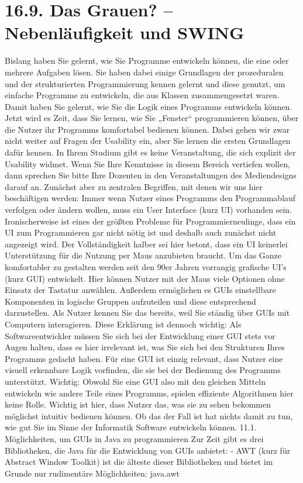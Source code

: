 \section{16.9.	Das Grauen? – Nebenläufigkeit und SWING}
Bislang haben Sie gelernt, wie Sie Programme entwickeln können, die eine oder mehrere Aufgaben lösen. Sie haben dabei einige Grundlagen der prozeduralen und der strukturierten Programmierung kennen gelernt und diese genutzt, um einfache Programme zu entwickeln, die aus Klassen zusammengesetzt waren.
Damit haben Sie gelernt, wie Sie die Logik eines Programms entwickeln können. Jetzt wird es Zeit, dass Sie lernen, wie Sie „Fenster“ programmieren können, über die Nutzer ihr Programms komfortabel bedienen können. Dabei gehen wir zwar nicht weiter auf Fragen der Usability  ein, aber Sie lernen die ersten Grundlagen dafür kennen. In Ihrem Studium gibt es keine Veranstaltung, die sich explizit der Usability widmet. Wenn Sie Ihre Kenntnisse in diesem Bereich vertiefen wollen, dann sprechen Sie bitte Ihre Dozenten in den Veranstaltungen des Mediendesigns darauf an.
Zunächst aber zu zentralen Begriffen, mit denen wir uns hier beschäftigen werden:
Immer wenn Nutzer eines Programms den Programmablauf verfolgen oder ändern wollen, muss ein User Interface (kurz UI) vorhanden sein. Ironischerweise ist eines der größten Probleme für Programmierneulinge, dass ein UI zum Programmieren gar nicht nötig ist und deshalb auch zunächst nicht angezeigt wird. Der Vollständigkeit halber sei hier betont, dass ein UI keinerlei Unterstützung für die Nutzung per Maus anzubieten braucht.
Um das Ganze komfortabler zu gestalten werden seit den 90er Jahren vorrangig grafische UI’s (kurz GUI) entwickelt. Hier können Nutzer mit der Maus viele Optionen ohne Einsatz der Tastatur anwählen. Außerdem ermöglichen es GUIs einstellbare Komponenten in logische Gruppen aufzuteilen und diese entsprechend darzustellen. Als Nutzer kennen Sie das bereits, weil Sie ständig über GUIs mit Computern interagieren. Diese Erklärung ist dennoch wichtig: Als Softwareentwickler müssen Sie sich bei der Entwicklung einer GUI  stets vor Augen halten, dass es hier irrelevant ist, was Sie sich bei den Strukturen Ihres Programms gedacht haben. Für eine GUI ist einzig relevant, dass Nutzer eine visuell erkennbare Logik vorfinden, die sie bei der Bedienung des Programms unterstützt.
Wichtig: Obwohl Sie eine GUI also mit den gleichen Mitteln entwickeln wie andere Teile eines Programms, spielen effiziente Algorithmen hier keine Rolle. Wichtig ist hier, dass Nutzer das, was sie zu sehen bekommen möglichst intuitiv bedienen können. Ob das der Fall ist hat nichts damit zu tun, wie gut Sie im Sinne der Informatik Software entwickeln können.
11.1.	Möglichkeiten, um GUIs in Java zu programmieren
Zur Zeit gibt es drei Bibliotheken, die Java für die Entwicklung von GUIs anbietet:
-	AWT (kurz für Abstract Window Toolkit) ist die älteste dieser Bibliotheken und bietet im Grunde nur rudimentäre Möglichkeiten: java.awt

